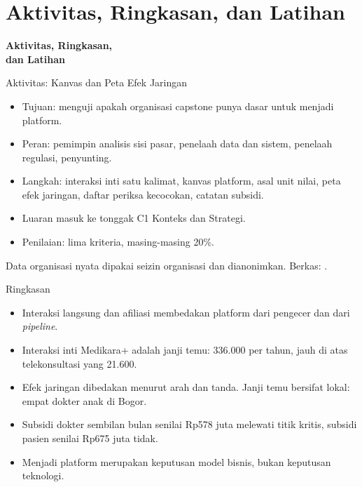 \documentclass[aspectratio=169, table, 12pt]{beamer}
\begin{document}
\section{Aktivitas, Ringkasan, dan Latihan}

\begin{frame}{\hfill}
  \centering
  \Huge{\textbf{Aktivitas, Ringkasan,\\dan Latihan}}
\end{frame}

\begin{frame}{{\Large Aktivitas: Kanvas dan Peta Efek Jaringan}}
  \begin{itemize}
    \item Tujuan: menguji apakah organisasi capstone punya dasar untuk menjadi platform.
    \item Peran: pemimpin analisis sisi pasar, penelaah data dan sistem, penelaah regulasi, penyunting.
    \item Langkah: interaksi inti satu kalimat, kanvas platform, asal unit nilai, peta efek jaringan, daftar periksa kecocokan, catatan subsidi.
    \item Luaran masuk ke tonggak C1 Konteks dan Strategi.
    \item Penilaian: lima kriteria, masing-masing 20\%.
  \end{itemize}
  \vspace{2pt}
  {\footnotesize Data organisasi nyata dipakai seizin organisasi dan dianonimkan. Berkas: .\par}
\end{frame}

\begin{frame}{{\Large Ringkasan}}
  \vspace{6pt}
  \begin{itemize}
    \item Interaksi langsung dan afiliasi membedakan platform dari pengecer dan dari \textit{pipeline}.
    \item Interaksi inti Medikara+ adalah janji temu: 336.000 per tahun, jauh di atas telekonsultasi yang 21.600.
    \item Efek jaringan dibedakan menurut arah dan tanda. Janji temu bersifat lokal: empat dokter anak di Bogor.
    \item Subsidi dokter sembilan bulan senilai Rp578 juta melewati titik kritis, subsidi pasien senilai Rp675 juta tidak.
    \item Menjadi platform merupakan keputusan model bisnis, bukan keputusan teknologi.
  \end{itemize}
\end{frame}
\end{document}
